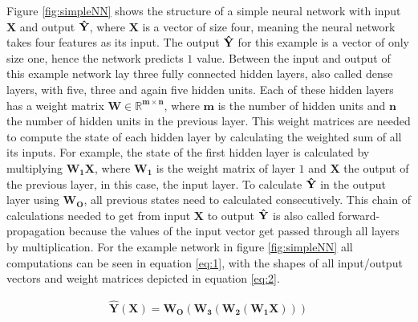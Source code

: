 Figure \ref{fig:simpleNN} shows the structure of a simple neural network with input $\mathbf{X}$ and output $\mathbf{\Hat{Y}}$, where $\mathbf{X}$ is a vector of size four, meaning the neural network takes four features as its input. 
The output $\mathbf{\Hat{Y}}$ for this example is a vector of only size one, hence the network predicts $1$ value.
Between the input and output of this example network lay three fully connected hidden layers, also called dense layers, with five, three and again five hidden units.
Each of these hidden layers has a weight matrix $\mathbf{W\in\mathbb{R}^{m\times n}}$, where $\mathbf{m}$ is the number of hidden units and $\mathbf{n}$ the number of hidden units in the previous layer.
This weight matrices are needed to compute the state of each hidden layer by calculating the weighted sum of all its inputs.
For example, the state of the first hidden layer is calculated by multiplying $\mathbf{W_1X}$, where $\mathbf{W_1}$ is the weight matrix of layer $1$ and $\mathbf{X}$ the output of the previous layer, in this case, the input layer.
To calculate  $\mathbf{\Hat{Y}}$ in the output layer using $\mathbf{W_O}$, all previous states need to calculated consecutively. 
This chain of calculations needed to get from input $\mathbf{X}$ to output $\mathbf{\Hat{Y}}$ is also called forward-propagation because the values of the input vector get passed through all layers by multiplication.
For the example network in figure \ref{fig:simpleNN} all computations can be seen in equation \ref{eq:1}, with the shapes of all input/output vectors and weight matrices depicted in equation \ref{eq:2}.

\begin{equation} \label{eq:1}
\begin{gathered}
\mathbf{\hat{Y}(X)} = \mathbf{W_O(W_3(W_2(W_1X)))}
\end{gathered}
\end{equation}


